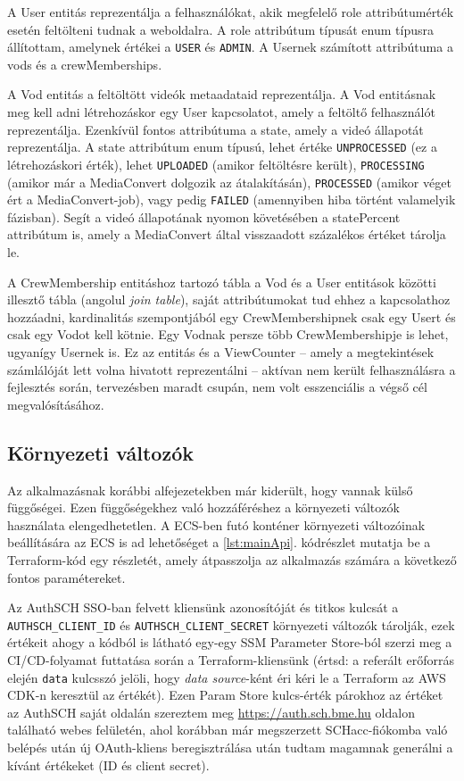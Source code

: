 A User entitás reprezentálja a felhasználókat, akik megfelelő role attribútumérték esetén feltölteni tudnak a weboldalra. A role attribútum típusát enum típusra állítottam, amelynek értékei a \verb|USER| és \verb|ADMIN|. A Usernek számított attribútuma a vods és a crewMemberships.

A Vod entitás a feltöltött videók metaadataid reprezentálja. A Vod entitásnak meg kell adni létrehozáskor egy User kapcsolatot, amely a feltöltő felhasználót reprezentálja. Ezenkívül fontos attribútuma a state, amely a videó állapotát reprezentálja. A state attribútum enum típusú, lehet értéke \verb|UNPROCESSED| (ez a létrehozáskori érték), lehet \verb|UPLOADED| (amikor feltöltésre került), \verb|PROCESSING| (amikor már a MediaConvert dolgozik az átalakításán), \verb|PROCESSED| (amikor véget ért a MediaConvert-job), vagy pedig \verb|FAILED| (amennyiben hiba történt valamelyik fázisban). Segít a videó állapotának nyomon követésében a statePercent attribútum is, amely a MediaConvert által visszaadott százalékos értéket tárolja le.

A CrewMembership entitáshoz tartozó tábla a Vod és a User entitások közötti illesztő tábla (angolul \emph{join table}), saját attribútumokat tud ehhez a kapcsolathoz hozzáadni, kardinalitás szempontjából egy CrewMembershipnek csak egy Usert és csak egy Vodot kell kötnie. Egy Vodnak persze több CrewMembershipje is lehet, ugyanígy Usernek is. Ez az entitás és a ViewCounter -- amely a megtekintések számlálóját lett volna hivatott reprezentálni -- aktívan nem került felhasználásra a fejlesztés során, tervezésben maradt csupán, nem volt esszenciális a végső cél megvalósításához.

\subsection{Környezeti változók}\label{sec:envvars}

Az alkalmazásnak korábbi alfejezetekben már kiderült, hogy vannak külső függőségei. Ezen függőségekhez való hozzáféréshez a környezeti változók használata elengedhetetlen. A ECS-ben futó konténer környezeti változóinak beállítására az ECS is ad lehetőséget a \ref{lst:mainApi}. kódrészlet mutatja be a Terraform-kód egy részletét, amely átpasszolja az alkalmazás számára a következő fontos paramétereket.

Az AuthSCH SSO-ban felvett kliensünk azonosítóját és titkos kulcsát a \verb|AUTHSCH_CLIENT_ID| és \verb|AUTHSCH_CLIENT_SECRET| környezeti változók tárolják, ezek értékeit ahogy a kódból is látható egy-egy SSM Parameter Store-ból szerzi meg a CI/CD-folyamat futtatása során a Terraform-kliensünk (értsd: a referált erőforrás elején \verb|data| kulcsszó jelöli, hogy \emph{data source}-ként éri kéri le a Terraform az AWS CDK-n keresztül az értékét). Ezen Param Store kulcs-érték párokhoz az értéket az AuthSCH saját oldalán szereztem meg \url{https://auth.sch.bme.hu} oldalon található webes felületén, ahol korábban már megszerzett SCHacc-fiókomba való belépés után új OAuth-kliens beregisztrálása után tudtam magamnak generálni a kívánt értékeket (ID és client secret).

